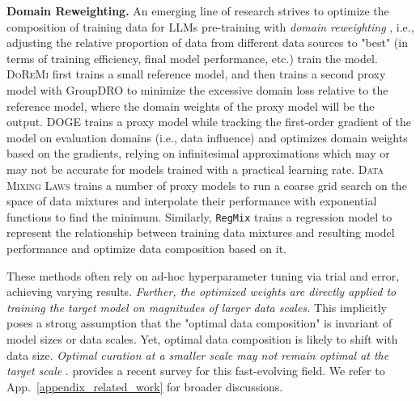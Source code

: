 \documentclass{article} %
\begin{document}
\textbf{Domain Reweighting.} An emerging line of research strives to optimize the composition of training data for LLMs pre-training with \textit{domain reweighting} , i.e., adjusting the relative proportion of data from different data sources to "best" (in terms of training efficiency, final model performance, etc.) train the model. 
\textsc{DoReMi} \citep{xie2024doremi} first trains a small reference model, and then trains a second proxy model with GroupDRO \citep{sagawa2019distributionally} to minimize the excessive domain loss relative to the reference model, where the domain weights of the proxy model will be the output. \textsc{DOGE} \citep{fan2023doge} trains a proxy model while tracking the first-order gradient of the model on evaluation domains (i.e., data influence) and optimizes domain weights based on the gradients, relying on infinitesimal approximations which may or may not be accurate for models trained with a practical learning rate. \textsc{Data Mixing Laws} \citep{ye2024data} trains a number of proxy models to run a coarse grid search on the space of data mixtures and interpolate their performance with exponential functions to find the minimum. Similarly, \texttt{RegMix}\citep{liu2024regmix} trains a regression model to represent the relationship between training data mixtures and resulting model performance and optimize data composition based on it. 

These methods often rely on ad-hoc hyperparameter tuning via trial and error, achieving varying results. \textit{Further, the optimized weights are directly applied to training the target model on magnitudes of larger data scales.} This implicitly poses a strong assumption that the "optimal data composition" is invariant of model sizes or data scales. Yet, optimal data composition is likely to shift with data size. \textit{Optimal curation at a smaller scale may not remain optimal at the target scale} \citep{sorscher2022beyond,goyal2024science}. 
\citep{albalak2024survey} provides a recent survey for this fast-evolving field. We refer to App.~\ref{appendix_related_work} for broader discussions.   
\end{document}
